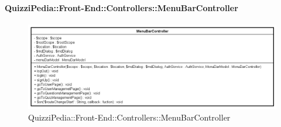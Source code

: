 \paragraph{QuizziPedia::Front-End::Controllers::MenuBarController}
\begin{figure} [ht]
	\centering
	\includegraphics[scale=0.45]{UML/Classi/Front-End/QuizziPedia_Front-end_Controller_MenuBarController.png}
	\caption{QuizziPedia::Front-End::Controllers::MenuBarController}
\end{figure} \FloatBarrier
